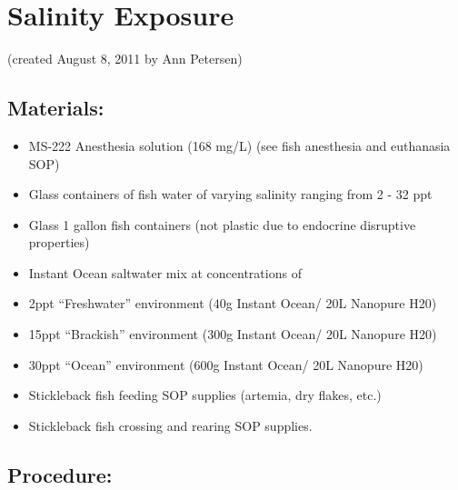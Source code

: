 \documentclass[
]{book}
\providecommand{\tightlist}{%
  \setlength{\itemsep}{0pt}\setlength{\parskip}{0pt}}
\begin{document}
\hypertarget{salinity-exposure}{%
\section{Salinity Exposure}\label{salinity-exposure}}

(created August 8, 2011 by Ann Petersen)

\hypertarget{materials-7}{%
\subsection{Materials:}\label{materials-7}}

\begin{itemize}
\tightlist
\item
  MS-222 Anesthesia solution (168 mg/L) (see fish anesthesia and euthanasia SOP)
\item
  Glass containers of fish water of varying salinity ranging from 2 - 32 ppt
\item
  Glass 1 gallon fish containers (not plastic due to endocrine disruptive properties)
\item
  Instant Ocean saltwater mix at concentrations of
\item
  2ppt ``Freshwater'' environment (40g Instant Ocean/ 20L Nanopure H20)
\item
  15ppt ``Brackish'' environment (300g Instant Ocean/ 20L Nanopure H20)
\item
  30ppt ``Ocean'' environment (600g Instant Ocean/ 20L Nanopure H20)
\item
  Stickleback fish feeding SOP supplies (artemia, dry flakes, etc.)
\item
  Stickleback fish crossing and rearing SOP supplies.
\end{itemize}

\hypertarget{procedure-11}{%
\subsection{Procedure:}\label{procedure-11}}
\end{document}
